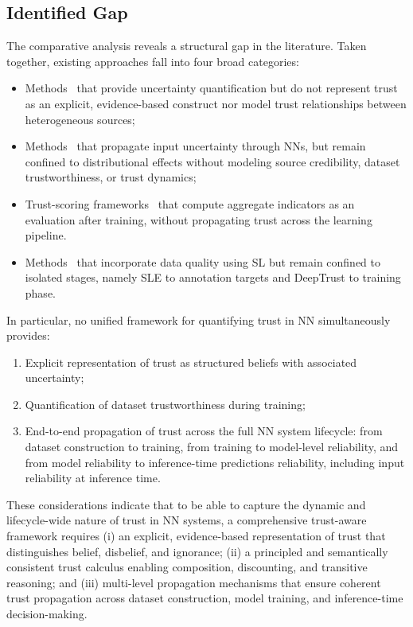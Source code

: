 \subsection*{Identified Gap}
The comparative analysis reveals a structural gap in the literature.
Taken together, existing approaches fall into four broad categories:
\begin{itemize}
    \item Methods~\cite{lakshminarayanan2017simplescalablepredictiveuncertainty,neal1996bayesian,sensoy2018evidentialdeeplearningquantify} that provide uncertainty quantification but do not represent trust as an explicit, evidence-based construct nor model trust relationships between heterogeneous sources; 
    \item Methods~\cite{pmlr-v202-monchot23a,astudillo2011propagation} that propagate input uncertainty through \acp{NN}, but remain confined to distributional effects without modeling source credibility, dataset trustworthiness, or trust dynamics;
    \item Trust-scoring frameworks~\cite{10.1145/3605098.3635966,wong2021reallytrustyousimple} that compute aggregate indicators as an evaluation after training, without propagating trust across the learning pipeline.
    \item Methods~\cite{SLencodings,10.3389/frai.2020.00054} that incorporate data quality using \ac{SL} but remain confined to isolated stages, namely \ac{SLE} to annotation targets and DeepTrust to training phase.
\end{itemize}

In particular, no unified framework for quantifying trust in \ac{NN} simultaneously provides:
\begin{enumerate}
    \item Explicit representation of trust as structured beliefs with associated uncertainty;
    \item Quantification of dataset trustworthiness during training;
    \item End-to-end propagation of trust across the full \ac{NN} system lifecycle: from dataset construction to training, from training to model-level reliability, and from model reliability to inference-time predictions reliability, including input reliability at inference time.
\end{enumerate}

These considerations indicate that to be able to capture the dynamic and lifecycle-wide nature of trust in \ac{NN} systems, a comprehensive trust-aware framework requires (i) an explicit, evidence-based representation of trust that distinguishes belief, disbelief, and ignorance; (ii) a principled and semantically consistent trust calculus enabling composition, discounting, and transitive reasoning; and (iii) multi-level propagation mechanisms that ensure coherent trust propagation across dataset construction, model training, and inference-time decision-making.

